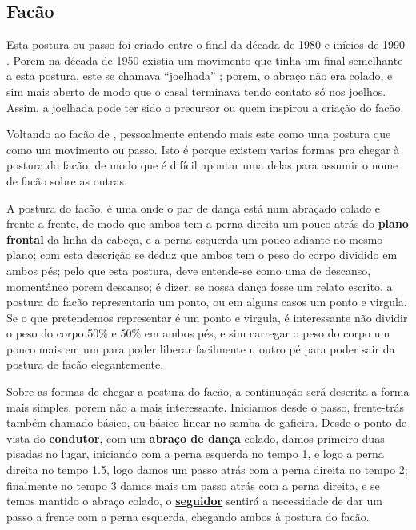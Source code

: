 \subsection{Facão}
\label{subsec:desc:passo:facao}

\caracterpostura{\CheckedItem}{\NoCheckedItem}
Esta postura ou passo foi  criado entre o final da década de 1980 e inícios de 1990  \cite[pp. 143]{perna2002samba}.
Porem na década de 1950 existia um movimento que tinha um final semelhante a esta postura, 
este se chamava ``joelhada'' \cite[pp. 160]{fornaciari1950aprender};
porem, o abraço  não era colado,
e sim mais aberto de modo que o casal terminava tendo contato só nos joelhos.
Assim, a joelhada pode ter sido o precursor ou quem inspirou a criação do facão.

Voltando ao facão de \AnoLivro, pessoalmente entendo mais este como uma postura que 
como um movimento ou passo. Isto é porque existem varias formas pra chegar à postura do facão,
de modo que é difícil apontar uma delas para assumir o nome de facão sobre as outras.

A postura do facão, é uma onde o par de dança está num abraçado colado e frente a frente, 
de modo que ambos tem a perna direita um pouco atrás do \hyperref[def:PlanoFrontal]{\textbf{plano frontal}} da linha da cabeça,
e a perna esquerda um pouco adiante no mesmo plano; com esta descrição se deduz 
que ambos tem o peso do corpo dividido em ambos pés; pelo que esta postura,
deve entende-se como uma de descanso, momentâneo porem descanso;
é dizer, se nossa dança fosse um relato escrito, a postura do facão
representaria um ponto, ou em alguns casos um ponto e virgula.
Se o que pretendemos representar é um ponto e virgula, 
é interessante não dividir o peso do corpo 50\% e 50\% em ambos pés,
e sim carregar o peso do corpo um pouco mais em um 
para poder liberar facilmente u outro pé para poder sair da postura de facão elegantemente.  

Sobre as formas de chegar a postura do facão, a continuação será descrita a forma mais simples,
porem não a mais interessante. Iniciamos desde o passo, frente-trás também chamado básico, 
ou básico linear no samba de gafieira. Desde o ponto de vista do \hyperref[def:Condutor]{\textbf{condutor}}, 
com um \hyperref[def:abracodedanca]{\textbf{abraço de dança}} colado,
damos primeiro duas pisadas no lugar, iniciando com a perna esquerda no tempo 1, e logo a perna direita no tempo 1.5,
logo damos um passo atrás com a perna direita no tempo 2; 
finalmente no tempo 3 damos mais um passo atrás com a perna direita, 
e se temos mantido o abraço colado, 
o \hyperref[def:Seguidor]{\textbf{seguidor}} sentirá a necessidade de dar um passo a frente com a perna esquerda,
chegando ambos à postura do facão.  

